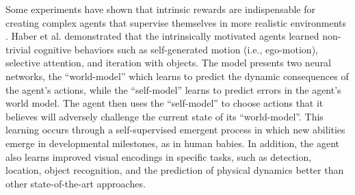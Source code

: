 

Some experiments have shown that intrinsic rewards are indispensable for creating complex agents that supervise themselves in more realistic environments \cite{haber2018learning}. Haber et al. \cite{haber2018learning} demonstrated that the intrinsically motivated agents learned non-trivial cognitive behaviors such as self-generated motion (i.e., ego-motion), selective attention, and iteration with objects. The model presents two neural networks, the ``world-model'' which learns to predict the dynamic consequences of the agent's actions, while the ``self-model'' learns to predict errors in the agent's world model. The agent then uses the ``self-model'' to choose actions that it believes will adversely challenge the current state of its ``world-model''. This learning occurs through a self-supervised emergent process in which new abilities emerge in developmental milestones, as in human babies. In addition, the agent also learns improved visual encodings in specific tasks, such as detection, location, object recognition, and the prediction of physical dynamics better than other state-of-the-art approaches.



